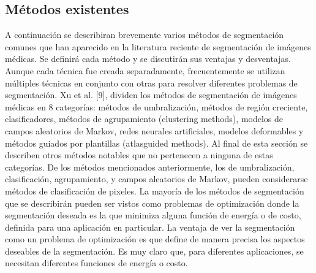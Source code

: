 \subsection{M\'etodos existentes}
A continuaci\'on se describiran brevemente varios m\'etodos de segmentaci\'on comunes que han aparecido en la literatura reciente de segmentaci\'on de im\'agenes m\'edicas.
Se definir\'a cada m\'etodo y se discutir\'an sus ventajas y desventajas. Aunque cada t\'ecnica fue
creada separadamente, frecuentemente se utilizan m\'ultiples t\'ecnicas en conjunto con otras
para resolver diferentes problemas de segmentaci\'on.
Xu et al. [9], dividen los m\'etodos de segmentaci\'on de im\'agenes m\'edicas en 8
categor\'ias: m\'etodos de umbralizaci\'on, m\'etodos de regi\'on creciente, clasificadores, m\'etodos
de agrupamiento (clustering methods), modelos de campos aleatorios de Markov, redes
neurales artificiales, modelos deformables y m\'etodos guiados por plantillas (atlasguided
methods). Al final de esta secci\'on se describen otros m\'etodos notables que no pertenecen a
ninguna de estas categor\'ias. De los m\'etodos mencionados anteriormente, los de
umbralizaci\'on, clasificaci\'on, agrupamiento, y campos aleatorios de Markov, pueden
considerarse m\'etodos de clasificaci\'on de pixeles.
La mayor\'ia de los m\'etodos de segmentaci\'on que se describir\'an pueden ser vistos
como problemas de optimizaci\'on donde la segmentaci\'on deseada es la que minimiza alguna
funci\'on de energ\'ia o de costo, definida para una aplicaci\'on en particular. La ventaja de ver
la segmentaci\'on como un problema de optimizaci\'on es que define de manera precisa los
aspectos deseables de la segmentaci\'on. Es muy claro que, para diferentes aplicaciones, se
necesitan diferentes funciones de energ\'ia o costo.

